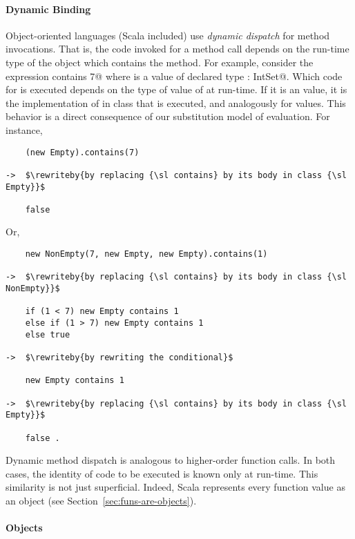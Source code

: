 \documentclass[11pt]{book}
\newcommand{\rewriteby}[1]{\mbox{\tab\tab\rm(#1)}}
\begin{document}
\paragraph{Dynamic Binding}

Object-oriented languages (Scala included) use \emph{dynamic dispatch}
for method invocations.  That is, the code invoked for a method call
depends on the run-time type of the object which contains the method.
For example, consider the expression \verb@s contains 7@ where
\verb@s@ is a value of declared type \verb@s: IntSet@. Which code for
\verb@contains@ is executed depends on the type of value of \verb@s@ at run-time.
If it is an \verb@Empty@ value, it is the implementation of \verb@contains@ in class \verb@Empty@ that is executed, and analogously for \verb@NonEmpty@ values. 
This behavior is a direct consequence of our substitution model of evaluation.
For instance,
\begin{verbatim}
    (new Empty).contains(7) 

->  $\rewriteby{by replacing {\sl contains} by its body in class {\sl Empty}}$

    false
\end{verbatim}
Or,
\begin{verbatim}
    new NonEmpty(7, new Empty, new Empty).contains(1)

->  $\rewriteby{by replacing {\sl contains} by its body in class {\sl NonEmpty}}$

    if (1 < 7) new Empty contains 1
    else if (1 > 7) new Empty contains 1
    else true

->  $\rewriteby{by rewriting the conditional}$

    new Empty contains 1

->  $\rewriteby{by replacing {\sl contains} by its body in class {\sl Empty}}$

    false .
\end{verbatim}

Dynamic method dispatch is analogous to higher-order function
calls. In both cases, the identity of code to be executed is known
only at run-time. This similarity is not just superficial. Indeed,
Scala represents every function value as an object (see
Section~\ref{sec:funs-are-objects}).


\paragraph{Objects}
\end{document}

